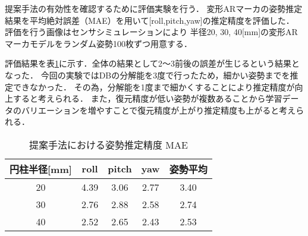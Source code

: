 \documentclass{jsarticle}
\begin{document}
提案手法の有効性を確認するために評価実験を行う．
変形ARマーカの姿勢推定結果を平均絶対誤差（MAE）を用いて[roll,pitch,yaw]の推定精度を評価した．
評価を行う画像はセンサシミュレーションにより	
半径20, 30, 40[mm]の変形ARマーカモデルをランダム姿勢100枚ずつ用意する．

評価結果を表\ref{hyouka}に示す．全体の結果として2～3前後の誤差が生じるという結果となった．
今回の実験ではDBの分解能を3度で行ったため，細かい姿勢までを推定できなかった．
その為，分解能を1度まで細かくすることにより推定精度が向上すると考えられる．
また，復元精度が低い姿勢が複数あることから学習データのバリエーションを増やすことで復元精度が上がり推定精度も上がると考えられる．




\begin{table}[h]
        \vspace{0zh}
          \begin{center}
            \caption{提案手法における姿勢推定精度 MAE}
            \label{hyouka}
            \begin{tabular}{c|c|c|c|c} \hline
              円柱半径[mm]   & roll& pitch & yaw&姿勢平均 \\ \hline
              20& 4.39 & 3.06 & 2.77 &3.40\\ \hline
              30&2.76 & 2.88 & 2.58& 2.74 \\ \hline
              40&2.52 &2.65  &2.43&2.53 \\ \hline
              \end{tabular}
          \end{center}
        \vspace{-1.0zh}
\end{table}

\end{document}
